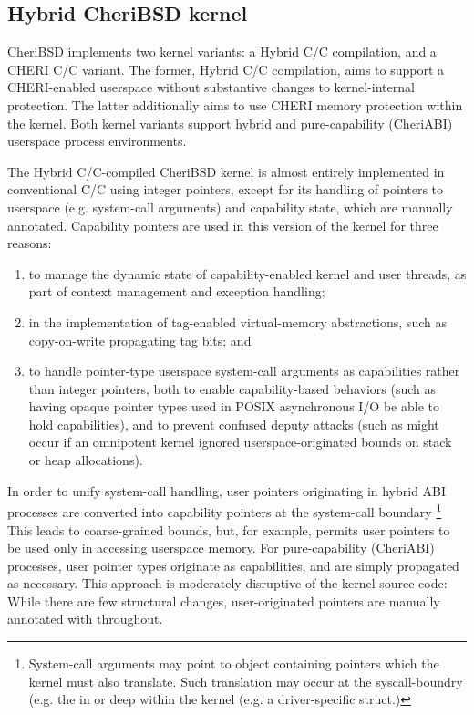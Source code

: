 \documentclass[12pt,twoside,openright,a4paper]{article}
\newcommand{\ccode}[1]{{\small\ttfamily{#1}}}
\newcommand{\uucap}{{\ccode{\_\_capability}}\xspace}
\newcommand{\note}[2]{{\color{blue}[ Note: #1 - #2]}}
\renewcommand{\note}[2]{\relax\ifhmode\unskip\fi}
\newcommand{\psnote}[1]{\note{#1}{Peter S.}}
\newcommand*{\cpp}{\texorpdfstring{C\textsmaller[2]{\protect\nolinebreak[4]\hspace{-.05em}\raisebox{.45ex}{\textbf{++}}}}{C++}}
\newcommand*{\COrCpp}{C/\cpp{}}
\newcommand*{\purecapCOrCpp}{CHERI \COrCpp{}}
\newcommand*{\hybridCOrCpp}{Hybrid \COrCpp{}}
\begin{document}
\subsection{Hybrid CheriBSD kernel}

\psnote{I know this isn't really supposed to be standalone, but best say \emph{something} about what CheriBSD is, rather than introducing it en passant}

CheriBSD implements two kernel variants: a \hybridCOrCpp{} compilation, and a
\purecapCOrCpp{} variant.
The former, \hybridCOrCpp{} compilation, aims to support a CHERI-enabled userspace
without substantive changes to kernel-internal protection.
The latter additionally aims to use CHERI memory protection within the
kernel.
\psnote{say explicitly that we don't discuss the latter further here?  Otherwise it's confusing to set up the opposition but then only talk about the former below}
Both kernel variants support hybrid and pure-capability (CheriABI) userspace
process environments.

The \hybridCOrCpp{}-compiled CheriBSD kernel is almost entirely implemented
in conventional \COrCpp{} using integer pointers, except for its handling of
pointers to userspace (e.g.  system-call arguments) and capability state,
which are manually annotated.
Capability pointers are used in this version of the kernel for three reasons:

\begin{enumerate}
\item to manage the dynamic state of capability-enabled kernel and user
  threads, as part of context management and exception handling;

\item in the implementation of tag-enabled virtual-memory abstractions, such
  as copy-on-write propagating tag bits; and

\item to handle pointer-type userspace system-call arguments as capabilities
  rather than integer pointers, both to enable capability-based behaviors
  (such as having opaque pointer types used in POSIX asynchronous I/O be able
  to hold capabilities), and to prevent confused deputy attacks (such as might
  occur if an omnipotent kernel ignored userspace-originated bounds on stack
  or heap allocations).
\end{enumerate}

In order to unify system-call handling, user pointers originating in hybrid
ABI processes are converted into capability pointers at the system-call
boundary%
\footnote{System-call arguments may point to object containing pointers
which the kernel must also translate.
Such translation may occur at the syscall-boundry (e.g. the \ccode{struct iovec}
in \ccode{readv} or deep within the kernel (e.g. a driver-specific \ccode{ioctl}
struct.)}
%
This leads to coarse-grained bounds, but, for example, permits user pointers to
be used only in accessing userspace memory.
For pure-capability (CheriABI) processes, user pointer types originate as
capabilities, and are simply propagated as necessary.
This approach is moderately disruptive of the kernel source code: While there
are few structural changes, user-originated pointers are manually annotated
with \uucap{} throughout.
\end{document}
